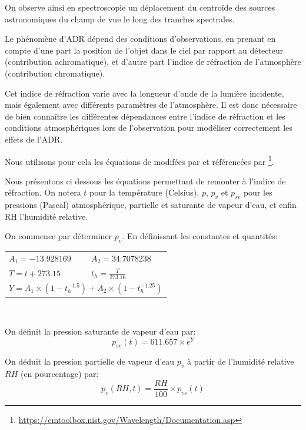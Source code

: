 \documentclass[../main/main.tex]{subfiles}
\begin{document}
On observe ainsi en spectroscopie un déplacement du centroïde des
sources astronomiques du champ de vue le long des tranches spectrales.

Le phénomène d'ADR dépend des conditions d'observations, en prenant en
compte d'une part la position de l'objet dans le ciel par rapport au
détecteur (contribution achromatique), et d'autre part
l'indice de réfraction de l'atmosphère (contribution chromatique).

Cet indice de réfraction varie avec la longueur d'onde de la lumière
incidente, mais également avec différents paramètres de l'atmosphère. Il
est donc nécessaire de bien connaître les différentes dépendances entre
l'indice de réfraction et les conditions atmosphériques lors de
l'observation pour modéliser correctement les effets de l'ADR.

Nous utilisons pour cela les équations de \citet{Edlen1966} modifées
par \citet{Birch1993, Birch1994} et référencées par \citet{Stone2001}\footnote{\url{https://emtoolbox.nist.gov/Wavelength/Documentation.asp}}.

Nous présentons ci dessous les équations permettant de remonter à
l'indice de réfraction. On notera $t$ pour la température (Celsius),
$p$, $p_{v}$ et $p_{sv}$ pour les pressions (Pascal) atmosphérique,
partielle et saturante de
vapeur d'eau, et enfin RH l'humidité relative.

On commence par déterminer $p_{v}$.
En définissant les constantes et quantités:

\begin{center}
  \renewcommand{\arraystretch}{1.5}
  \begin{tabular}{ll}
   
$A_1= -13.928169$ & $A_2 = 34.7078238$ \\
$T= t + 273.15$ & $t_h = \frac{T}{273.16}$ \\
  \multicolumn{2}{c}{$Y = A_1 \times(1 - t_h^{-1.5}) + A_2 \times (1 - t_h^{-1.25})$}
\end{tabular}\\
\end{center}

On définit la pression saturante de vapeur d'eau par:
\begin{equation}
  \label{eq:pvs}
    p_{sv}(t) = 611.657 \times e^{Y}
\end{equation}

On déduit la pression partielle de vapeur d'eau $p_v$ à partir de
l'humidité relative $RH$ (en pourcentage) par:
\begin{equation}
 \label{eq:pv}
    p_v(RH,t) = \frac{RH}{100}\times p_{vs}(t)
\end{equation}
\end{document}
